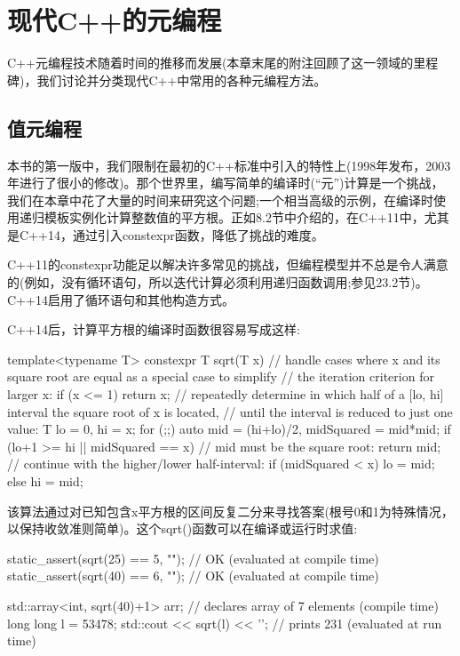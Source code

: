 \section{现代C++的元编程}

C++元编程技术随着时间的推移而发展(本章末尾的附注回顾了这一领域的里程碑)，我们讨论并分类现代C++中常用的各种元编程方法。

\subsection{值元编程}

本书的第一版中，我们限制在最初的C++标准中引入的特性上(1998年发布，2003年进行了很小的修改)。那个世界里，编写简单的编译时(“元”)计算是一个挑战，我们在本章中花了大量的时间来研究这个问题;一个相当高级的示例，在编译时使用递归模板实例化计算整数值的平方根。正如8.2节中介绍的，在C++11中，尤其是C++14，通过引入constexpr函数，降低了挑战的难度。

\begin{notice}
C++11的constexpr功能足以解决许多常见的挑战，但编程模型并不总是令人满意的(例如，没有循环语句，所以迭代计算必须利用递归函数调用;参见23.2节)。C++14启用了循环语句和其他构造方式。
\end{notice}

C++14后，计算平方根的编译时函数很容易写成这样:

\begin{cpp}
template<typename T>
constexpr T sqrt(T x)
{
	// handle cases where x and its square root are equal as a special case to simplify
	// the iteration criterion for larger x:
	if (x <= 1) {
		return x;
	}
	// repeatedly determine in which half of a [lo, hi] interval the square root of x is located,
	// until the interval is reduced to just one value:
	T lo = 0, hi = x;
	for (;;) {
		auto mid = (hi+lo)/2, midSquared = mid*mid;
		if (lo+1 >= hi || midSquared == x) {
			// mid must be the square root:
			return mid;
		}
		// continue with the higher/lower half-interval:
		if (midSquared < x) {
			lo = mid;
		}
		else {
			hi = mid;
		}
	}
}
\end{cpp}

该算法通过对已知包含x平方根的区间反复二分来寻找答案(根号0和1为特殊情况，以保持收敛准则简单)。这个sqrt()函数可以在编译或运行时求值:

\begin{cpp}
static_assert(sqrt(25) == 5, ""); // OK (evaluated at compile time)
static_assert(sqrt(40) == 6, ""); // OK (evaluated at compile time)

std::array<int, sqrt(40)+1> arr; // declares array of 7 elements (compile time)
long long l = 53478;
std::cout << sqrt(l) << '\n'; // prints 231 (evaluated at run time)
\end{cpp}

